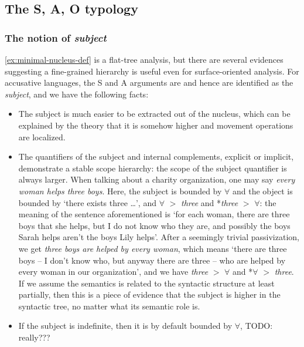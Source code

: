 \documentclass[UTF8, a4paper, oneside, scheme=plain]{ctexart}
\newcommand*{\term}[1]{\emph{#1}}
\newcommand*{\corpus}[1]{\emph{#1}}
\begin{document}
\subsection{The S, A, O typology}



\subsubsection{The notion of \term{subject}}\label{sec:subject-alignment}

\eqref{ex:minimal-nucleus-def} is a flat-tree analysis, 
but there are several evidences suggesting 
a fine-grained hierarchy is useful even for surface-oriented analysis.
For accusative languages, 
the S and A arguments are and hence are identified as the \term{subject}, 
and we have the following facts:
\begin{itemize}
    \item The subject is much easier to be extracted out of the nucleus,
    which can be explained by the theory that 
    it is somehow higher and movement operations are localized.
    \item The quantifiers of the subject and internal complements, 
    explicit or implicit, 
    demonstrate a stable scope hierarchy:
    the scope of the subject quantifier is always larger.
    When talking about a charity organization,
    one may say \corpus{every woman helps three boys}.
    Here, the subject is bounded by $\forall$ and the object is bounded by `there exists three \dots',
    and $\forall$ $>$ \corpus{three} and *\corpus{three} $>$ $\forall$:
    the meaning of the sentence aforementioned is 
    `for each woman, there are three boys that she helps,
    but I do not know who they are,
    and possibly the boys Sarah helps aren't the boys Lily helps'.
    After a seemingly trivial passivization, 
    we get \corpus{three boys are helped by every woman},
    which means 
    `there are three boys -- I don't know who, but anyway there are three -- 
    who are helped by every woman in our organization',
    and we have \corpus{three} $>$ $\forall$ and *$\forall$ $>$ \corpus{three}.
    If we assume the semantics is related to the syntactic structure at least partially,
    then this is a piece of evidence that the subject is higher in the syntactic tree,
    no matter what its semantic role is. 
    \item If the subject is indefinite, then it is by default bounded by $\forall$, TODO: really???
    

\end{itemize}
\end{document}
